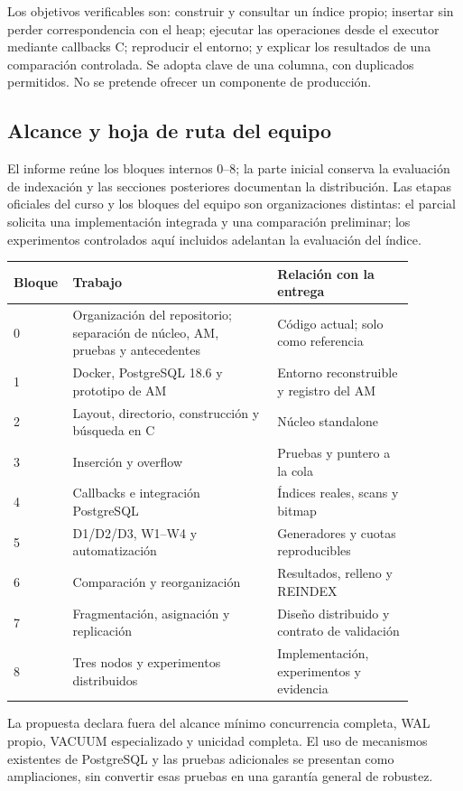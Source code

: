 \documentclass[11pt,a4paper]{article}
\newcommand{\code}[1]{\texttt{\detokenize{#1}}}
\begin{document}
Los objetivos verificables son: construir y consultar un índice propio; insertar
sin perder correspondencia con el heap; ejecutar las operaciones desde el
executor mediante callbacks C; reproducir el entorno; y explicar los resultados
de una comparación controlada. Se adopta clave \code{int4} de una columna, con
duplicados permitidos. No se pretende ofrecer un componente de producción.

\subsection{Alcance y hoja de ruta del equipo}

El informe reúne los bloques internos 0--8; la parte inicial conserva la
evaluación de indexación y las secciones posteriores documentan la distribución. Las etapas oficiales del curso
y los bloques del equipo son organizaciones distintas: el parcial solicita una
implementación integrada y una comparación preliminar; los experimentos
controlados aquí incluidos adelantan la evaluación del índice.

\begin{longtable}{P{0.08\linewidth}P{0.48\linewidth}P{0.32\linewidth}}
\toprule
Bloque & Trabajo & Relación con la entrega\\
 & Organización del repositorio; separación de núcleo, AM, pruebas y antecedentes
  & Código actual; \code{legacy/} solo como referencia\\
1 & Docker, PostgreSQL 18.6 y prototipo de AM
  & Entorno reconstruible y registro del AM\\
2 & Layout, directorio, construcción y búsqueda en C
  & Núcleo standalone\\
3 & Inserción y overflow
  & Pruebas y puntero a la cola\\
4 & Callbacks e integración PostgreSQL
  & Índices reales, scans y bitmap\\
5 & D1/D2/D3, W1--W4 y automatización
  & Generadores y cuotas reproducibles\\
6 & Comparación y reorganización
  & Resultados, relleno y REINDEX\\
7 & Fragmentación, asignación y replicación
  & Diseño distribuido y contrato de validación\\
8 & Tres nodos y experimentos distribuidos
  & Implementación, experimentos y evidencia\\
\bottomrule
\end{longtable}

La propuesta declara fuera del alcance mínimo concurrencia completa, WAL propio,
VACUUM especializado y unicidad completa. El uso de mecanismos existentes de
PostgreSQL y las pruebas adicionales se presentan como ampliaciones, sin convertir
esas pruebas en una garantía general de robustez.
\end{document}
